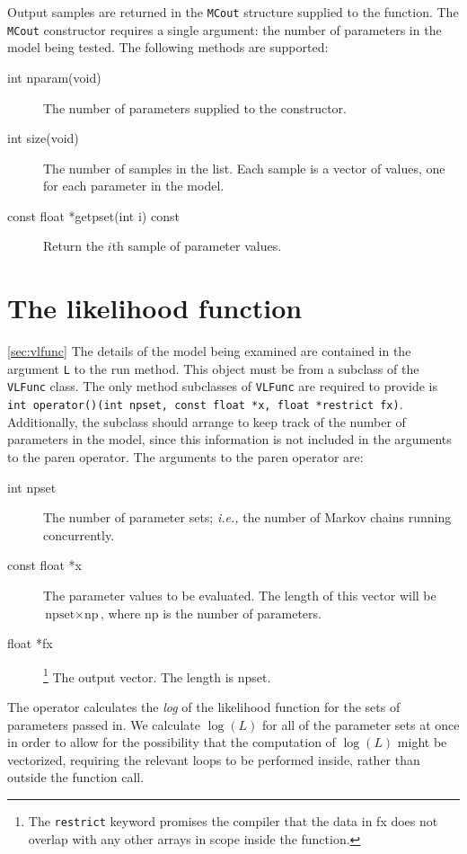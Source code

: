 \documentclass[11pt]{article}
\begin{document}
Output samples are returned in the \texttt{MCout} structure supplied
to the function.  The \texttt{MCout} constructor requires a single
argument:  the number of parameters in the model being tested.  The
following methods are supported:
\begin{description}
\item[int nparam(void)] The number of parameters supplied to the
  constructor.
\item[int size(void)] The number of samples in the list.  Each sample
  is a vector of values, one for each parameter in the model.
\item[const float *getpset(int i) const] Return the $i$th sample of
  parameter values.
\end{description}

\section{The likelihood function}
\ref{sec:vlfunc}
The details of the model being examined are contained in the argument
\texttt{L} to the run method.  This object must be from a subclass of
the \texttt{VLFunc} class.  The only method subclasses of
\texttt{VLFunc} are required to provide is
\verb=int operator()(int npset, const float *x, float *restrict fx)=.
Additionally, the subclass should arrange to keep track of the number
of parameters in the model, since this information is not included in
the arguments to the paren operator.  The arguments to the paren
operator are:
\begin{description}
\item[int npset] The number of parameter sets; \emph{i.e.,} the number
  of Markov chains running concurrently.
\item[const float *x] The parameter values to be evaluated.  The
  length of this vector will be $\text{npset} \times \text{np}$, where
  np is the number of parameters.
\item[float *fx]\footnote{The \texttt{restrict} keyword promises the
  compiler that the data in fx does not overlap with any other arrays
  in scope inside the function.}  The output vector.  The length is npset.
\end{description}

The operator calculates the \emph{log} of the likelihood function for
the sets of parameters passed in.  We calculate $\log(L)$ for all of
the parameter sets at once in order to allow for the possibility that
the computation of $\log(L)$ might be vectorized, requiring the
relevant loops to be performed inside, rather than outside the
function call.
\end{document}

